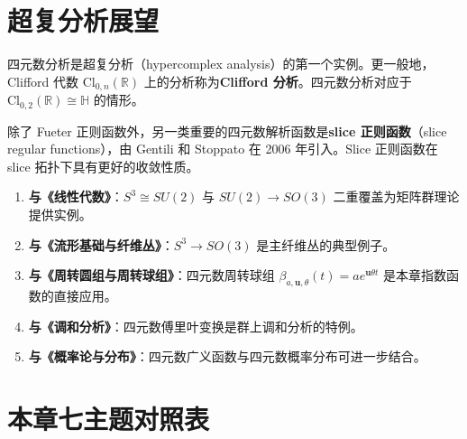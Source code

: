\section{超复分析展望}

\begin{remark}[Clifford 分析]\label{rem:q_clifford}
四元数分析是超复分析（hypercomplex analysis）的第一个实例。更一般地，Clifford 代数 $\mathrm{Cl}_{0,n}(\mathbb{R})$ 上的分析称为\textbf{Clifford 分析}。四元数分析对应于 $\mathrm{Cl}_{0,2}(\mathbb{R})\cong\mathbb{H}$ 的情形。
\end{remark}

\begin{remark}\label{rem:q_slice_regular}
除了 Fueter 正则函数外，另一类重要的四元数解析函数是\textbf{slice 正则函数}（slice regular functions），由 Gentili 和 Stoppato 在 2006 年引入。Slice 正则函数在 slice 拓扑下具有更好的收敛性质。
\end{remark}

\begin{remark}[与后续章节的接口]\label{rem:q_interfaces}
\begin{enumerate}[label=(\roman*)]
    \item \textbf{与《线性代数》}：$S^3\cong SU(2)$ 与 $SU(2)\to SO(3)$ 二重覆盖为矩阵群理论提供实例。
    \item \textbf{与《流形基础与纤维丛》}：$S^3\to SO(3)$ 是主纤维丛的典型例子。
    \item \textbf{与《周转圆组与周转球组》}：四元数周转球组 $\beta_{a,\mathbf{u},\theta}(t)=ae^{\mathbf{u}\theta t}$ 是本章指数函数的直接应用。
    \item \textbf{与《调和分析》}：四元数傅里叶变换是群上调和分析的特例。
    \item \textbf{与《概率论与分布》}：四元数广义函数与四元数概率分布可进一步结合。
\end{enumerate}
\end{remark}

\section*{本章七主题对照表}

